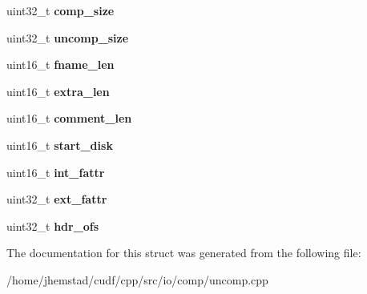 \begin{DoxyCompactItemize}
\item 
uint32\+\_\+t {\bfseries comp\+\_\+size}\hypertarget{structzip__cdfh__s_acf5d934f03c088ef957213187a76aebc}{}\label{structzip__cdfh__s_acf5d934f03c088ef957213187a76aebc}

\item 
uint32\+\_\+t {\bfseries uncomp\+\_\+size}\hypertarget{structzip__cdfh__s_ad4e6a09899049f1122479ca9f714b42e}{}\label{structzip__cdfh__s_ad4e6a09899049f1122479ca9f714b42e}

\item 
uint16\+\_\+t {\bfseries fname\+\_\+len}\hypertarget{structzip__cdfh__s_a13e1554a29a1879333ee3572ad384933}{}\label{structzip__cdfh__s_a13e1554a29a1879333ee3572ad384933}

\item 
uint16\+\_\+t {\bfseries extra\+\_\+len}\hypertarget{structzip__cdfh__s_abb82c21fa968e8d5cbb1f62e39d3e01d}{}\label{structzip__cdfh__s_abb82c21fa968e8d5cbb1f62e39d3e01d}

\item 
uint16\+\_\+t {\bfseries comment\+\_\+len}\hypertarget{structzip__cdfh__s_aa03dcc76a818f67db4f0f2678f4a6778}{}\label{structzip__cdfh__s_aa03dcc76a818f67db4f0f2678f4a6778}

\item 
uint16\+\_\+t {\bfseries start\+\_\+disk}\hypertarget{structzip__cdfh__s_a42db25b67263f54ae1b40aee5fa01ee9}{}\label{structzip__cdfh__s_a42db25b67263f54ae1b40aee5fa01ee9}

\item 
uint16\+\_\+t {\bfseries int\+\_\+fattr}\hypertarget{structzip__cdfh__s_a11d1512bbbf873bfb6565a803fd0dedc}{}\label{structzip__cdfh__s_a11d1512bbbf873bfb6565a803fd0dedc}

\item 
uint32\+\_\+t {\bfseries ext\+\_\+fattr}\hypertarget{structzip__cdfh__s_a9e98f49cf3e45da3752ec155fd815fc0}{}\label{structzip__cdfh__s_a9e98f49cf3e45da3752ec155fd815fc0}

\item 
uint32\+\_\+t {\bfseries hdr\+\_\+ofs}\hypertarget{structzip__cdfh__s_ae06be2b3748bc68e87000a0f8dcafc95}{}\label{structzip__cdfh__s_ae06be2b3748bc68e87000a0f8dcafc95}

\end{DoxyCompactItemize}


The documentation for this struct was generated from the following file\+:\begin{DoxyCompactItemize}
\item 
/home/jhemstad/cudf/cpp/src/io/comp/uncomp.\+cpp\end{DoxyCompactItemize}
